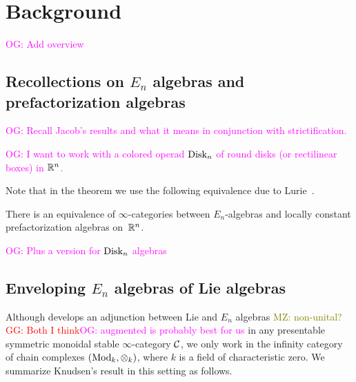 \documentclass[11pt]{amsart}
\numberwithin{equation}{section}
\def\owen{\textcolor{magenta}{OG: }\textcolor{magenta}}
\def\mahmoud{\textcolor{olive}{MZ: }\textcolor{olive}}
\def\greg{\textcolor{red}{GG: }\textcolor{red}}
\begin{document}
\section{Background}

\owen{Add overview}

\subsection{Recollections on $E_n$ algebras and prefactorization algebras}
\label{sec: en background}

\owen{Recall Jacob's results and what it means in conjunction with strictification.}

\owen{I want to work with a colored operad ${\rm Disk}_n$ of round disks (or rectilinear boxes) in $\mathbb R^n$.}

Note that in the theorem we use the following equivalence due to Lurie~\cite{LurieHA}. 

\begin{thm}
\label{T:En=Fac} 
There is an equivalence of $\infty$-categories between $E_n$-algebras and locally constant prefactorization algebras on~$\mathbb R^n$. 
\end{thm}

\owen{Plus a version for ${\rm Disk}_n$ algebras}

\subsection{Enveloping $E_n$ algebras of Lie algebras}
\label{sec: enveloping}

Although \cite{Knudsen} develops an adjunction between Lie and $E_n$ algebras \mahmoud{non-unital?}\greg{Both I think}\owen{augmented is probably best for us}
in any presentable symmetric monoidal stable $\infty$-category $\mathcal C$,
we only work in the infinity category of chain complexes $({\rm Mod}_k, \otimes_k)$, where $k$ is a field of characteristic zero.
We summarize Knudsen's result in this setting as follows.
\end{document}
